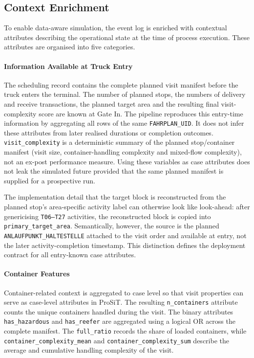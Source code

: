 \subsection{Context Enrichment}
\label{sec:context_enrichment}

To enable data-aware simulation, the event log is enriched with
contextual attributes describing the operational state at the time of
process execution. These attributes are organised into five
categories.

\paragraph{Information Available at Truck Entry}
\label{sec:entry_known_attributes}

The scheduling record contains the complete planned visit manifest before
the truck enters the terminal. The number of planned stops,
the numbers of delivery and receive transactions, the planned target area
and the resulting final visit-complexity score are known at Gate In. The
pipeline reproduces this entry-time information by aggregating all rows of
the same \texttt{FAHRPLAN\_UID}. It does not infer these attributes from
later realised durations or completion outcomes.
\texttt{visit\_complexity} is a deterministic summary of the planned
stop/container manifest (visit size, container-handling complexity and
mixed-flow complexity), not an ex-post performance measure. Using these
variables as case attributes does not leak the simulated future
provided that the same planned manifest is supplied for a prospective run.

The implementation detail that the target block is reconstructed from the
planned stop's area-specific activity label can otherwise look like
look-ahead: after genericising \texttt{T06--T27} activities, the reconstructed
block is copied into \texttt{primary\_target\_area}. Semantically, however,
the source is the planned \texttt{ANLAUFPUNKT\_HALTESTELLE} attached to the
visit order and available at entry, not the later activity-completion
timestamp. This distinction defines the deployment contract for all
entry-known case attributes.

\paragraph{Container Features}

Container-related context is aggregated to case level so that visit
properties can serve as case-level attributes in ProSiT. The resulting
\texttt{n\_containers} attribute counts the unique containers handled during
the visit. The binary attributes \texttt{has\_hazardous} and
\texttt{has\_reefer} are aggregated using a logical OR across the complete
manifest. The \texttt{full\_ratio} records the share of loaded containers,
while \texttt{container\_complexity\_mean} and
\texttt{container\_complexity\_sum} describe the average and cumulative
handling complexity of the visit.

